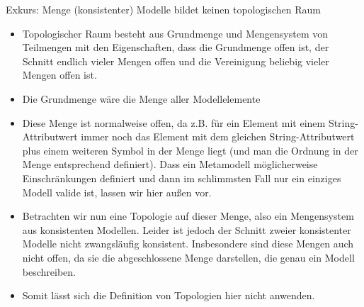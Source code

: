 


Exkurs: Menge (konsistenter) Modelle bildet keinen topologischen Raum
\begin{itemize}
    \item Topologischer Raum besteht aus Grundmenge und Mengensystem von Teilmengen mit den Eigenschaften, dass die Grundmenge offen ist, der Schnitt endlich vieler Mengen offen und die Vereinigung beliebig vieler Mengen offen ist. 
    \item Die Grundmenge wäre die Menge aller Modellelemente
    \item Diese Menge ist normalweise offen, da z.B. für ein Element mit einem String-Attributwert immer noch das Element mit dem gleichen String-Attributwert plus einem weiteren Symbol in der Menge liegt (und man die Ordnung in der Menge entsprechend definiert). Dass ein Metamodell möglicherweise Einschränkungen definiert und dann im schlimmsten Fall nur ein einziges Modell valide ist, lassen wir hier außen vor.
    \item Betrachten wir nun eine Topologie auf dieser Menge, also ein Mengensystem aus konsistenten Modellen. Leider ist jedoch der Schnitt zweier konsistenter Modelle nicht zwangsläufig konsistent. Insbesondere sind diese Mengen auch nicht offen, da sie die abgeschlossene Menge darstellen, die genau ein Modell beschreiben. 
    \item Somit lässt sich die Definition von Topologien hier nicht anwenden.
\end{itemize}



